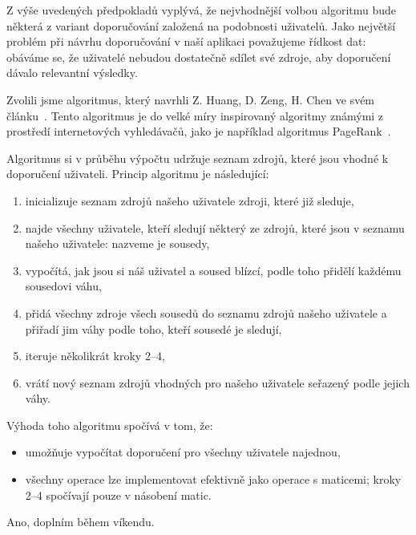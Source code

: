 Z výše uvedených předpokladů vyplývá, že nejvhodnější volbou algoritmu bude některá z variant doporučování založená na podobnosti uživatelů.
Jako největší problém při návrhu doporučování v naší aplikaci považujeme řídkost dat: obáváme se, že uživatelé nebudou dostatečně sdílet své zdroje, aby doporučení dávalo relevantní výsledky.

Zvolili jsme algoritmus, který navrhli Z. Huang, D. Zeng, H. Chen ve svém článku~\cite{huang2004link}.
Tento algoritmus je do velké míry inspirovaný algoritmy známými z prostředí internetových vyhledávačů, jako je například algoritmus PageRank~\cite{page1999pagerank}.

Algoritmus si v průběhu výpočtu udržuje seznam zdrojů, které jsou vhodné k doporučení uživateli.
Princip algoritmu je následující:
\begin{enumerate}
    \item inicializuje seznam zdrojů našeho uživatele zdroji, které již sleduje,
    \item najde všechny uživatele, kteří sledují některý ze zdrojů, které jsou v seznamu našeho uživatele: nazveme je sousedy,
    \item vypočítá, jak jsou si náš uživatel a soused blízcí, podle toho přidělí každému sousedovi váhu,
    \item přidá všechny zdroje všech sousedů do seznamu zdrojů našeho uživatele a přiřadí jim váhy podle toho, kteří sousedé je sledují,
    \item iteruje několikrát kroky 2--4,
    \item vrátí nový seznam zdrojů vhodných pro našeho uživatele seřazený podle jejich váhy.
\end{enumerate}

Výhoda toho algoritmu spočívá v tom, že:
\begin{itemize}
    \item umožňuje vypočítat doporučení pro všechny uživatele najednou,
    \item všechny operace lze implementovat efektivně jako operace s maticemi; kroky 2--4 spočívají pouze v násobení matic.
\end{itemize}



Ano, doplním během víkendu.


